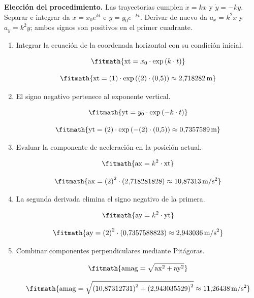 \noindent\textbf{Elección del procedimiento.} Las trayectorias cumplen $\dot x=kx$ y $\dot y=-ky$. Separar e integrar da $x=x_0e^{kt}$ e $y=y_0e^{-kt}$. Derivar de nuevo da $a_x=k^2x$ y $a_y=k^2y$; ambos signos son positivos en el primer cuadrante.

\begin{enumerate}

\item Integrar la ecuación de la coordenada horizontal con su condición inicial.

\[\fitmath{\mathrm{xt}=x_{0}\cdot \exp\left(k\cdot t\right)}\]

\[\fitmath{\mathrm{xt}=(1)\cdot \exp\left((2)\cdot (0{,}5)\right)\approx 2{,}718282\,\mathrm{m}}\]

\item El signo negativo pertenece al exponente vertical.

\[\fitmath{\mathrm{yt}=y_{0}\cdot \exp\left(-k\cdot t\right)}\]

\[\fitmath{\mathrm{yt}=(2)\cdot \exp\left(-(2)\cdot (0{,}5)\right)\approx 0{,}7357589\,\mathrm{m}}\]

\item Evaluar la componente de aceleración en la posición actual.

\[\fitmath{\mathrm{ax}={k}^{2}\cdot \mathrm{xt}}\]

\[\fitmath{\mathrm{ax}={(2)}^{2}\cdot (2{,}718281828)\approx 10{,}87313\,\mathrm{m/s^{2}}}\]

\item La segunda derivada elimina el signo negativo de la primera.

\[\fitmath{\mathrm{ay}={k}^{2}\cdot \mathrm{yt}}\]

\[\fitmath{\mathrm{ay}={(2)}^{2}\cdot (0{,}7357588823)\approx 2{,}943036\,\mathrm{m/s^{2}}}\]

\item Combinar componentes perpendiculares mediante Pitágoras.

\[\fitmath{\mathrm{amag}=\sqrt{{\mathrm{ax}}^{2}+{\mathrm{ay}}^{2}}}\]

\[\fitmath{\mathrm{amag}=\sqrt{{(10{,}87312731)}^{2}+{(2{,}943035529)}^{2}}\approx 11{,}26438\,\mathrm{m/s^{2}}}\]

\end{enumerate}
